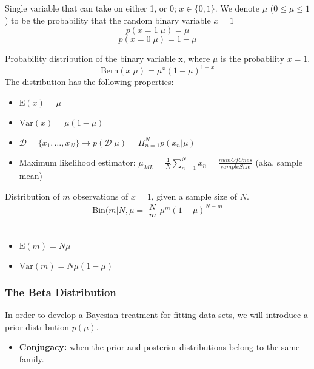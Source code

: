 \begin{defn}
	Single variable that can take on either 1, or 0; $x\in \{0, 1\}$. We denote $\mu$ ($0\leq\mu\leq 1$) to be the probability that the random binary variable $x=1$
	$$p(x=1|\mu)=\mu$$
	$$p(x=0|\mu)=1-\mu$$
\end{defn}

\begin{defn}
	Probability distribution of the binary variable x, where $\mu$ is the probability $x=1$.
	$$\text{Bern}(x|\mu)=\mu^x(1-\mu)^{1-x}$$
	The distribution has the following properties:
	\begin{itemize}
		\item $\text{E}(x)=\mu$
		\item $\text{Var}(x)=\mu (1-\mu)$
		\item $\mathcal{D}=\{x_1,\ldots ,x_N\} \to p(\mathcal{D} | \mu )=\Pi_{n=1}^{N}p(x_n|\mu)$
		\item Maximum likelihood estimator: $\mu_{ML}=\frac{1}{N}\sum_{n=1}^{N}x_n=\frac{numOfOnes}{sampleSize}$ (aka. sample mean)
	\end{itemize}
\end{defn}

\begin{defn}
	Distribution of $m$ observations of $x=1$, given a sample size of $N$. 
	$$\text{Bin} (m|N,\mu={\substack{N\\m}}\mu^m (1-\mu )^{N-m}$$\
	\begin{itemize}
		\item $\text{E}(m)=N\mu$
		\item $\text{Var}(m)=N\mu (1-\mu )$
	\end{itemize}
\end{defn}

\subsubsection{The Beta Distribution}
In order to develop a Bayesian treatment for fitting data sets, we will introduce a prior distribution $p(\mu)$.

\begin{itemize}[--]
	\item \textbf{Conjugacy:} when the prior and posterior distributions belong to the same family.
\end{itemize}

